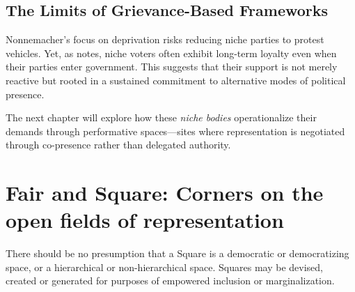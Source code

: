 \begin{greenenv}
	\subsection{The Limits of Grievance-Based Frameworks}
	Nonnemacher’s \parencite*{nonnemacher2023} focus on deprivation risks reducing niche parties to protest vehicles. Yet, as \cite{stiers2024} notes, niche voters often exhibit long-term loyalty even when their parties enter government. This suggests that their support is not merely reactive but rooted in a sustained commitment to alternative modes of political presence.

	The next chapter will explore how these \textit{niche bodies} operationalize their demands through performative spaces—sites where representation is negotiated through co-presence rather than delegated authority.
\end{greenenv}



\section{Fair and Square: Corners on the open fields of representation}

\epigraph{There should be no presumption that a Square is a democratic or democratizing space, or a hierarchical or non-hierarchical space. Squares may be devised, created or generated for purposes of empowered inclusion or marginalization.}{\cite[11]{saward2024}}


